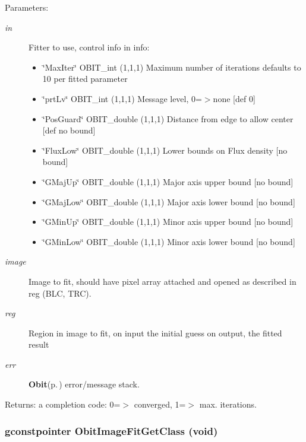 \begin{Desc}
\item[Parameters:]
\begin{description}
\item[{\em in}]Fitter to use, control info in info: \begin{itemize}
\item \char`\"{}Max\-Iter\char`\"{} OBIT\_\-int (1,1,1) Maximum number of iterations defaults to 10 per fitted parameter \item \char`\"{}prt\-Lv\char`\"{} OBIT\_\-int (1,1,1) Message level, 0=$>$none [def 0] \item \char`\"{}Pos\-Guard\char`\"{} OBIT\_\-double (1,1,1) Distance from edge to allow center [def no bound] \item \char`\"{}Flux\-Low\char`\"{} OBIT\_\-double (1,1,1) Lower bounds on Flux density [no bound] \item \char`\"{}GMaj\-Up\char`\"{} OBIT\_\-double (1,1,1) Major axis upper bound [no bound] \item \char`\"{}GMaj\-Low\char`\"{} OBIT\_\-double (1,1,1) Major axis lower bound [no bound] \item \char`\"{}GMin\-Up\char`\"{} OBIT\_\-double (1,1,1) Minor axis upper bound [no bound] \item \char`\"{}GMin\-Low\char`\"{} OBIT\_\-double (1,1,1) Minor axis lower bound [no bound] \end{itemize}
\item[{\em image}]Image to fit, should have pixel array attached and opened as described in reg (BLC, TRC). \item[{\em reg}]Region in image to fit, on input the initial guess on output, the fitted result \item[{\em err}]{\bf Obit}{\rm (p.\,\pageref{structObit})} error/message stack. \end{description}
\end{Desc}
\begin{Desc}
\item[Returns:]a completion code: 0=$>$ converged, 1=$>$ max. iterations. \end{Desc}
\subsubsection{\setlength{\rightskip}{0pt plus 5cm}gconstpointer Obit\-Image\-Fit\-Get\-Class (void)}\label{ObitImageFit_8c_a9}


